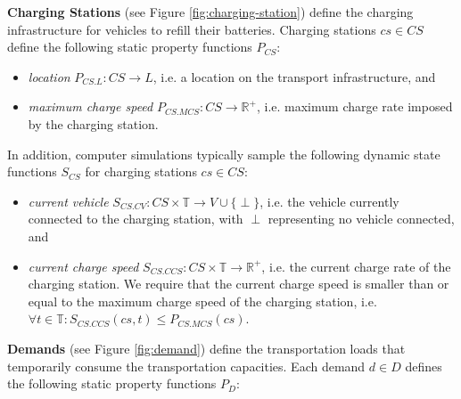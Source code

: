\documentclass[graybox]{svmult}
\begin{document}
\noindent
\textbf{Charging Stations} (see Figure \ref{fig:charging-station})
define the charging infrastructure for vehicles to refill their batteries.
Charging stations $cs \in CS$ define the following static property functions $P_{CS}$:
\begin{itemize}
	\item \textit{location} $P_{CS.L}: CS \rightarrow L$, i.e. a location on the transport infrastructure, and
	\item \textit{maximum charge speed} $P_{CS.MCS}: CS \rightarrow \mathbb{R}^+$, i.e. maximum charge rate imposed by the charging station.
\end{itemize}
In addition, computer simulations typically sample the following dynamic state functions $S_{CS}$ for charging stations $cs \in CS$:
\begin{itemize}
	\item \textit{current vehicle} $S_{CS.CV}: CS \times \mathbb{T} \rightarrow V \cup \{\perp\}$, i.e. the vehicle currently connected to the charging station, with $\perp$ representing no vehicle connected, and
	\item \textit{current charge speed} $S_{CS.CCS}: CS \times \mathbb{T} \rightarrow \mathbb{R}^+$, i.e. the current charge rate of the charging station. We require that the current charge speed is smaller than or equal to the maximum charge speed of the charging station, i.e.\ $\forall t \in \mathbb{T}: S_{CS.CCS}(cs,t) \leq P_{CS.MCS}(cs)$.
\end{itemize}

\vspace{2mm}
\noindent
\textbf{Demands} (see Figure \ref{fig:demand})
 define the transportation loads that temporarily consume the transportation capacities. Each demand $d \in D$ defines the following static property functions $P_D$:
\end{document}
